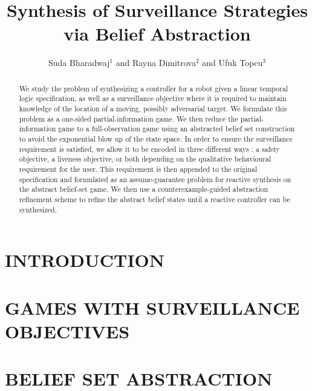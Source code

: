\documentclass[letterpaper, 10 pt, conference]{ieeeconf}  %
\title{\LARGE \bf Synthesis of Surveillance Strategies via Belief Abstraction}
\author{Suda Bharadwaj$^{1}$ and Rayna Dimitrova$^{2}$ and Ufuk Topcu$^{3}$%
}
\begin{document}
\maketitle
\thispagestyle{empty}
\pagestyle{empty}


\begin{abstract}
We study the problem of synthesizing a controller for a robot given a linear temporal logic specification, as well as a surveillance objective where it is required to maintain knowledge of the location of a moving, possibly adversarial target. We formulate this problem as a one-sided partial-information game. We then reduce the partial-information game to a full-observation game using an abstracted belief set construction to avoid the exponential blow up of the state space. In order to ensure the surveillance requirement is satisfied, we allow it to be encoded in three different ways : a safety objective, a liveness objective, or both depending on the qualitative behavioural requirement for the user. This requirement is then appended to the original specification and formulated as an assume-guarantee problem for reactive synthesis on the abstract belief-set game. We then use a counterexample-guided abstraction refinement scheme to refine the abstract belief states until a reactive controller can be synthesized.
\end{abstract}


\section{INTRODUCTION}




\section{GAMES WITH SURVEILLANCE OBJECTIVES}



\section{BELIEF SET ABSTRACTION}

\end{document}

